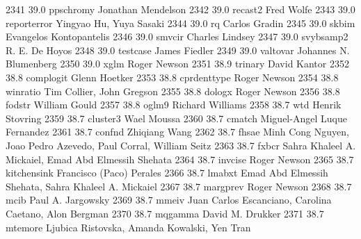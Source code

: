   2341     39.0    ppschromy     Jonathan Mendelson                      
  2342     39.0    recast2       Fred Wolfe                              
  2343     39.0    reporterror   Yingyao Hu, Yuya Sasaki                 
  2344     39.0    rq            Carlos Gradin                           
  2345     39.0    skbim         Evangelos Kontopantelis                 
  2346     39.0    smvcir        Charles Lindsey                         
  2347     39.0    svybsamp2     R. E. De Hoyos                          
  2348     39.0    testcase      James Fiedler                           
  2349     39.0    valtovar      Johannes N. Blumenberg                  
  2350     39.0    xglm          Roger Newson                            
  2351     38.9    trinary       David Kantor                            
  2352     38.8    complogit     Glenn Hoetker                           
  2353     38.8    cprdenttype   Roger Newson                            
  2354     38.8    winratio      Tim Collier, John Gregson               
  2355     38.8    dologx        Roger Newson                            
  2356     38.8    fodstr        William Gould                           
  2357     38.8    oglm9         Richard Williams                        
  2358     38.7    wtd           Henrik Stovring                         
  2359     38.7    cluster3      Wael Moussa                             
  2360     38.7    cmatch        Miguel-Angel Luque Fernandez            
  2361     38.7    confnd        Zhiqiang Wang                           
  2362     38.7    fhsae         Minh Cong Nguyen, Joao Pedro Azevedo,   
                                   Paul Corral, William Seitz              
  2363     38.7    fxbcr         Sahra Khaleel A. Mickaiel, Emad Abd     
                                   Elmessih Shehata                        
  2364     38.7    invcise       Roger Newson                            
  2365     38.7    kitchensink   Francisco (Paco) Perales                
  2366     38.7    lmabxt        Emad Abd Elmessih Shehata, Sahra        
                                   Khaleel A. Mickaiel                     
  2367     38.7    margprev      Roger Newson                            
  2368     38.7    mcib          Paul A. Jargowsky                       
  2369     38.7    mmeiv         Juan Carlos Escanciano, Carolina        
                                   Caetano, Alon Bergman                   
  2370     38.7    mqgamma       David M. Drukker                        
  2371     38.7    mtemore       Ljubica Ristovska, Amanda Kowalski, Yen 
                                   Tran                                    

